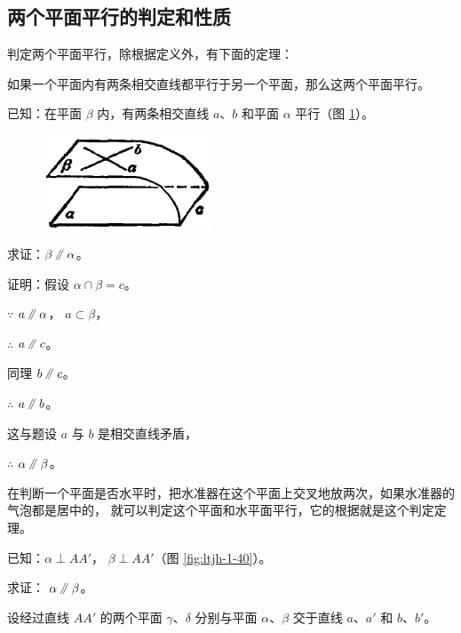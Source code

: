 \subsection{两个平面平行的判定和性质}\label{subsec:1-13}

判定两个平面平行，除根据定义外，有下面的定理：

\begin{dingli}[两个平面平行的判定定理][dl:lgpmpx-pd]
    如果一个平面内有两条相交直线都平行于另一个平面，那么这两个平面平行。
\end{dingli}

已知：在平面 $\beta$ 内，有两条相交直线 $a$、$b$ 和平面 $\alpha$ 平行（图 \ref{fig:ltjh-1-39}）。

\begin{figure}
    \centering
    \includegraphics[width=5cm]{../pic/ltjh-ch1-39.png}
    \caption{}\label{fig:ltjh-1-39}
\end{figure}

求证：$\beta \pingxing \alpha$。

证明：假设 $\alpha \cap \beta = c$。

$\because$ \quad $a \pingxing \alpha$， $a \subset \beta$，

$\therefore$ \quad $a \pingxing c$。

同理 \quad $b \pingxing c$。

$\therefore$ \quad $a \pingxing b$。

这与题设 $a$ 与 $b$ 是相交直线矛盾，

$\therefore$ \quad $\alpha \pingxing \beta$。

在判断一个平面是否水平时，把水准器在这个平面上交叉地放两次，如果水准器的气泡都是居中的，
就可以判定这个平面和水平面平行，它的根据就是这个判定定理。


\liti {}

已知：$\alpha \perp AA'$， $\beta \perp AA'$（图 \ref{fig:ltjh-1-40}）。

求证： $\alpha \pingxing \beta$。

\zhengming 设经过直线 $AA'$ 的两个平面 $\gamma$、$\delta$ 分别与平面 $\alpha$、$\beta$
交于直线 $a$、$a'$ 和 $b$、$b'$。


